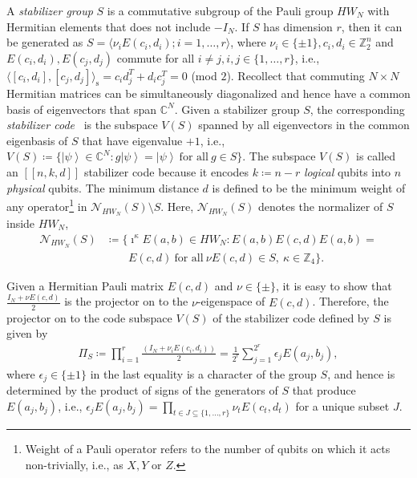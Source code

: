 \documentclass[twoside,romanappendices]{IEEEtran}
\newcommand{\ket}[1]{\left\lvert #1 \right\rangle}
\newcommand{\syminn}[2]{\langle #1, #2 \rangle_{\text{s}}}
\newcommand{\llbr}{[\![}
\newcommand{\rrbr}{]\!]}
\begin{document}
A \emph{stabilizer group} $S$ is a commutative subgroup of the Pauli group $HW_N$ with Hermitian elements that does not include $-I_N$.
If $S$ has dimension $r$, then it can be generated as $S = \langle \nu_i E(c_i,d_i) ; i = 1,\ldots,r \rangle$, where $\nu_i \in \{ \pm 1 \}, c_i, d_i \in \mathbb{Z}_2^n$ and $E(c_i,d_i), E(c_j,d_j)$ commute for all $i \neq j, i,j \in \{1,\ldots,r\}$, i.e., $\syminn{[c_i,d_i]}{[c_j,d_j]} = c_i d_j^T + d_i c_j^T = 0$ (mod $2$).
Recollect that commuting $N \times N$ Hermitian matrices can be simultaneously diagonalized and hence have a common basis of eigenvectors that span $\mathbb{C}^N$.
Given a stabilizer group $S$, the corresponding \emph{stabilizer code}~\cite{Nielsen-2010} is the subspace $V(S)$ spanned by all eigenvectors in the common eigenbasis of $S$ that have eigenvalue $+1$, i.e., $V(S) \coloneqq \{ \ket{\psi} \in \mathbb{C}^N \colon g \ket{\psi} = \ket{\psi}\ \text{for\ all}\ g \in S \}$.
The subspace $V(S)$ is called an $\llbr n,k,d \rrbr$ stabilizer code because it encodes $k \coloneqq n-r$ \emph{logical} qubits into $n$ \emph{physical} qubits. 
The minimum distance $d$ is defined to be the minimum weight of any operator\footnote{Weight of a Pauli operator refers to the number of qubits on which it acts non-trivially, i.e., as $X, Y$ or $Z$.} in $\mathcal{N}_{HW_N}(S) \setminus S$.
Here, $\mathcal{N}_{HW_N}(S)$ denotes the normalizer of $S$ inside $HW_N$, %
\begin{align}
\label{eq:normalizer_S}
\mathcal{N}_{HW_N}(S) & \coloneqq \{ \imath^{\kappa} E(a,b) \in HW_N \colon E(a,b) E(c,d) E(a,b) = \nonumber \\
%
  & \qquad E(c,d)\ \text{for\ all}\ \nu E(c,d) \in S,\ \kappa \in \mathbb{Z}_4 \}.
\end{align}

Given a Hermitian Pauli matrix $E(c,d)$ and $\nu \in \{ \pm \}$, it is easy to show that $\frac{I_N + \nu E(c,d)}{2}$ is the projector on to the $\nu$-eigenspace of $E(c,d)$.
Therefore, the projector on to the code subspace $V(S)$ of the stabilizer code defined by $S$ is given by
\begin{align}
\Pi_S \coloneqq \prod_{i=1}^{r} \frac{\left( I_N + \nu_i E(c_i,d_i) \right)}{2} = \frac{1}{2^r} \sum_{j = 1}^{2^r} \epsilon_j E(a_j, b_j),
\end{align}
where $\epsilon_j \in \{ \pm 1 \}$ in the last equality is a character of the group $S$, and hence is determined by the product of signs of the generators of $S$ that produce $E(a_j,b_j)$, i.e., $\epsilon_j E(a_j,b_j) = \prod_{t \in J \subseteq \{1,\ldots,r\}} \nu_t E(c_t,d_t)$ for a unique subset $J$.
\end{document}
